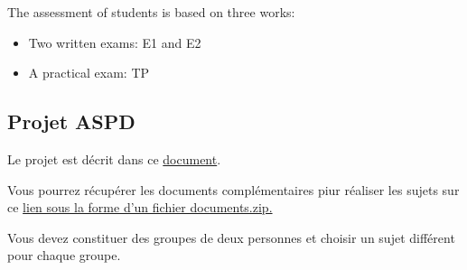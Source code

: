 \documentclass[ 12pt]{article}
\begin{document}
The assessment  of students is based on three works:
\begin{itemize}
\item Two  written  exams: E1 and E2
\item  A practical exam: TP
 \end{itemize}


  \subsection{Projet ASPD}
\label{sec:project}

Le  projet est décrit   dans ce
\href{http://mery54.github.io/teaching/aspd/lecturesnotes/projetaspd2025.pdf}{document}.

Vous pourrez  récupérer les  documents  complémentaires  piur réaliser
les sujets sur ce \href{http://mery54.github.io/teaching/aspd/lecturesnotes/documents.zip}{ lien  sous la forme  d'un fichier documents.zip.}



Vous devez  constituer des groupes de deux personnes   et choisir un
sujet  différent pour chaque groupe.





\end{document}
